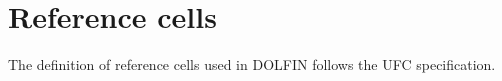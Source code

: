 \chapter{Reference cells}

The definition of reference cells used in DOLFIN follows the
UFC specification.~\cite{www:UFC}

